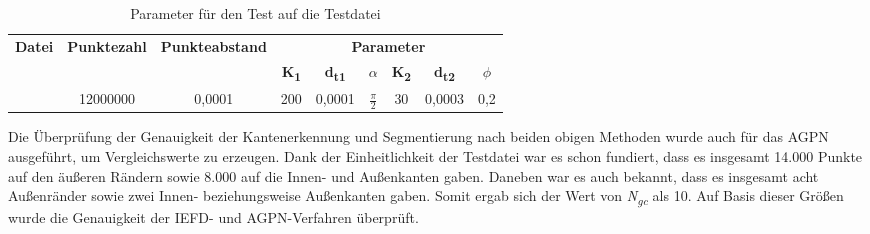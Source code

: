 \begin{table}
	\centering
	\begin{tabular}[width=\textwidth]{l *{8}{c}}
		\hline
		\multirow{2}{*}{\textbf{Datei}}&\multirow{2}{*}{\textbf{Punktezahl}}&\multirow{2}{*}{\textbf{Punkteabstand}}&\multicolumn{6}{c}{\textbf{Parameter}}\\
		& & & \textbf{K\textsubscript{1}} & \textbf{d\textsubscript{t1}} & \textbf{$\alpha$} & \textbf{K\textsubscript{2}} & \textbf{d\textsubscript{t2}} & \textbf{$\phi$} \\
		\hline
		\testcloud & 12000000 & 0,0001 & 200 & 0,0001 & $\frac{\pi}{2}$ & 30 & 0,0003 & 0,2 \\
		\hline
	\end{tabular}
	\caption{Parameter für den Test auf die Testdatei}
	\label{table: parameters_test1}
\end{table}

Die Überprüfung der Genauigkeit der Kantenerkennung und Segmentierung nach beiden obigen Methoden wurde auch für das AGPN ausgeführt, um Vergleichswerte zu erzeugen. Dank der Einheitlichkeit der Testdatei war es schon fundiert, dass es insgesamt 14.000 Punkte auf den äußeren Rändern sowie 8.000 auf die Innen- und Außenkanten gaben. Daneben war es auch bekannt, dass es insgesamt acht Außenränder sowie zwei Innen- beziehungsweise Außenkanten gaben. Somit ergab sich der Wert von \textit{N\textsubscript{gc}} als 10. Auf Basis dieser Größen wurde die Genauigkeit der IEFD- und AGPN-Verfahren überprüft.

